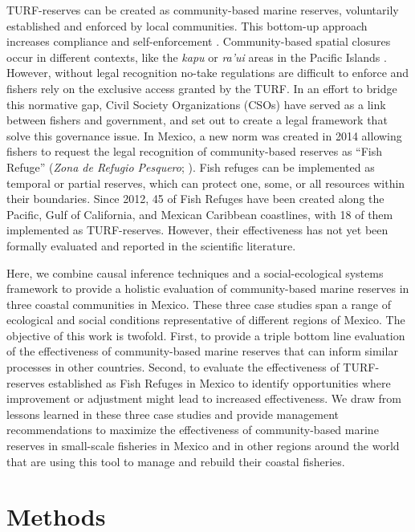 \documentclass{frontiersSCNS}
\theoremstyle{definition}
\theoremstyle{definition}
\theoremstyle{definition}
\theoremstyle{remark}
\begin{document}
TURF-reserves can be created as community-based marine reserves,
voluntarily established and enforced by local communities. This
bottom-up approach increases compliance and self-enforcement
\citep{gelcich_2015-Gw,espinosaromero_2014-PY,beger_2004-Y8}.
Community-based spatial closures occur in different contexts, like the
\emph{kapu} or \emph{ra'ui} areas in the Pacific Islands
\citep{bohnsack_2004,johannes_2002}. However, without legal recognition
no-take regulations are difficult to enforce and fishers rely on the
exclusive access granted by the TURF. In an effort to bridge this
normative gap, Civil Society Organizations (CSOs) have served as a link
between fishers and government, and set out to create a legal framework
that solve this governance issue. In Mexico, a new norm was created in
2014 allowing fishers to request the legal recognition of
community-based reserves as ``Fish Refuge'' (\emph{Zona de Refugio
Pesquero}; \citet{nom}). Fish refuges can be implemented as temporal or
partial reserves, which can protect one, some, or all resources within
their boundaries. Since 2012, 45 of Fish Refuges have been created along
the Pacific, Gulf of California, and Mexican Caribbean coastlines, with
18 of them implemented as TURF-reserves. However, their effectiveness
has not yet been formally evaluated and reported in the scientific
literature.

Here, we combine causal inference techniques and a social-ecological
systems framework to provide a holistic evaluation of community-based
marine reserves in three coastal communities in Mexico. These three case
studies span a range of ecological and social conditions representative
of different regions of Mexico. The objective of this work is twofold.
First, to provide a triple bottom line evaluation of the effectiveness
of community-based marine reserves that can inform similar processes in
other countries. Second, to evaluate the effectiveness of TURF-reserves
established as Fish Refuges in Mexico to identify opportunities where
improvement or adjustment might lead to increased effectiveness. We draw
from lessons learned in these three case studies and provide management
recommendations to maximize the effectiveness of community-based marine
reserves in small-scale fisheries in Mexico and in other regions around
the world that are using this tool to manage and rebuild their coastal
fisheries.

\section{Methods}\label{methods}
\end{document}
